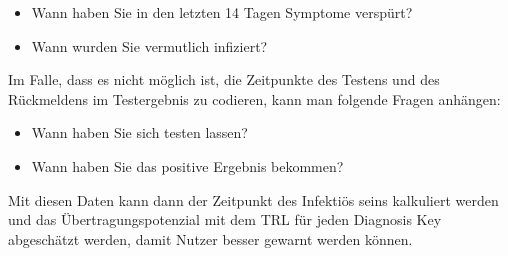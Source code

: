 \documentclass[conference]{IEEEtran}
\begin{document}
\begin{itemize}
	\item Wann haben Sie in den letzten 14 Tagen Symptome verspürt?
	\item Wann wurden Sie vermutlich infiziert?
\end{itemize}

Im Falle, dass es nicht möglich ist, die Zeitpunkte des Testens und  des Rückmeldens im Testergebnis zu codieren, kann man folgende Fragen anhängen:

\begin{itemize}
	\item Wann haben Sie sich testen lassen?
	\item Wann haben Sie das positive Ergebnis bekommen?
\end{itemize} 
	
Mit diesen Daten kann dann der Zeitpunkt des Infektiös seins kalkuliert werden und das Übertragungspotenzial mit dem TRL für jeden Diagnosis Key abgeschätzt werden, damit Nutzer besser gewarnt werden können.\\
\end{document}
